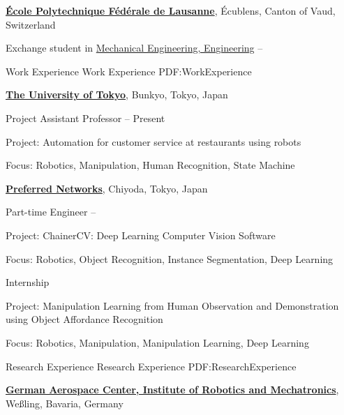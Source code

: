 \documentclass[letterpaper,MMMyyyy,nonstopmode]{simpleresumecv}
\begin{document}
\begin{Body}
\Gap
\Entry
\href{https://www.epfl.ch/en/}
{\textbf{École Polytechnique Fédérale de Lausanne}},
Écublens, Canton of Vaud, Switzerland
\Gap

\Gap
Exchange student in
\href{http://www.t.u-tokyo.ac.jp/en/foe}
{Mechanical Engineering, Engineering}
\hfill
{} --


\Section
{Work Experience}
{Work Experience}
{PDF:WorkExperience}

\Gap
\Entry
\href{https://www.u-tokyo.ac.jp/en/}
{\textbf{The University of Tokyo}},
Bunkyo, Tokyo, Japan
\Gap

\Gap
Project Assistant Professor
\hfill
{} --
Present
\begin{Detail}
Project:
Automation for customer service at restaurants using robots
\par
Focus:
Robotics, Manipulation, Human Recognition, State Machine
\end{Detail}
\Gap

\Gap
\Entry
\href{https://www.preferred.jp/en/}
{\textbf{Preferred Networks}},
Chiyoda, Tokyo, Japan
\Gap

\Gap
Part-time Engineer
\hfill
{} --
\begin{Detail}
Project:
ChainerCV: Deep Learning Computer Vision Software
\par
Focus:
Robotics, Object Recognition, Instance Segmentation, Deep Learning 
\end{Detail}
\Gap

\Gap
Internship
\hfill
{}
\begin{Detail}
Project:
Manipulation Learning from Human Observation and Demonstration using Object Affordance Recognition
\par
Focus:
Robotics, Manipulation, Manipulation Learning, Deep Learning
\end{Detail}
\Gap


\Section
{Research Experience}
{Research Experience}
{PDF:ResearchExperience}

\Gap
\Entry
\href{https://www.dlr.de/EN/Home/home_node.html}
{\textbf{German Aerospace Center, Institute of Robotics and Mechatronics}},
Weßling, Bavaria, Germany 
\Gap


\end{Body}
\end{document}

